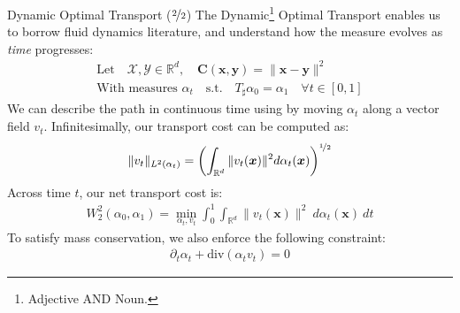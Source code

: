 \documentclass{beamer}
\begin{document}
\begin{frame}{Dynamic Optimal Transport ($\nicefrac{2}{2}$)}
	The Dynamic\footnote{Adjective AND Noun.} Optimal Transport enables us to borrow fluid dynamics literature, and understand how the measure evolves as \textit{time} progresses:
	\begin{gather}
		\text{Let} \quad \mathcal{X}, \mathcal{Y} \in \mathbb{R}^d, \quad \bm{C}(\bm{x}, \bm{y}) = \| \bm{x} - \bm{y} \|^2 \\
		\text{With measures } \alpha_t \quad \text{s.t.} \quad T_\sharp \alpha_0 = \alpha_1 \quad \forall t \in [0, 1]
	\end{gather} \pause
	We can describe the path in continuous time using by moving $\alpha_t$ along a vector field $v_t$. \pause Infinitesimally, our transport cost can be computed as:
	\begin{gather}
		\| v_t \|_{L^2(\alpha_t)} = \left(\int_{\mathbb{R}^d} \| v_t(\bm{x}) \|^2 d\alpha_t(\bm{x}) \right)^{\nicefrac{1}{2}}
	\end{gather} \pause
	Across time $t$, our net transport cost is:
	\begin{gather}
		W_2^2(\alpha_0, \alpha_1) = \min_{\alpha_t, v_t} \int_0^1 \int_{\mathbb{R}^d} \| v_t(\bm{x}) \|^2~d\alpha_t(\bm{x})~dt
	\end{gather} \pause
	To satisfy mass conservation, we also enforce the following constraint:
	\begin{gather}
		\partial_t \alpha_t + \mathrm{div}(\alpha_t v_t) = 0
	\end{gather}
\end{frame}
\end{document}

